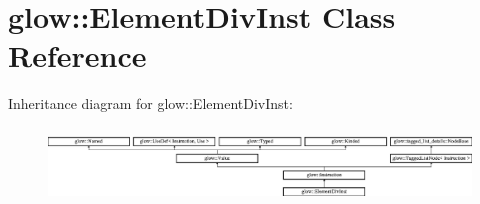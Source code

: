 \hypertarget{classglow_1_1_element_div_inst}{}\section{glow\+:\+:Element\+Div\+Inst Class Reference}
\label{classglow_1_1_element_div_inst}
Inheritance diagram for glow\+:\+:Element\+Div\+Inst\+:\begin{figure}[H]
\begin{center}
\leavevmode
\includegraphics[height=1.991111cm]{classglow_1_1_element_div_inst}
\end{center}
\end{figure}
